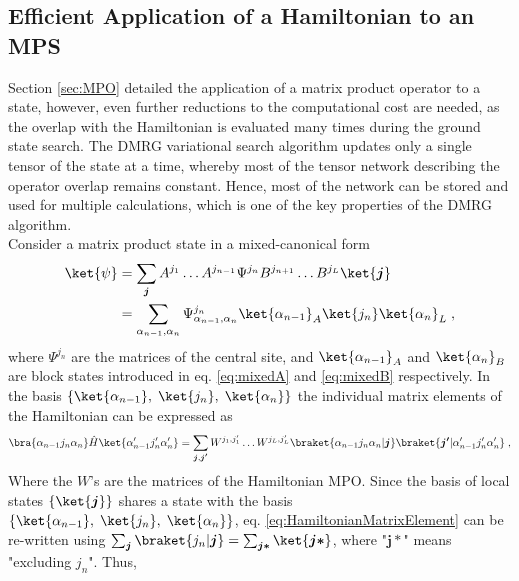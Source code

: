 \subsection{Efficient Application of a Hamiltonian to an MPS}
Section \ref{sec:MPO} detailed the application of a matrix product operator to a state, however, even further reductions to the computational cost are needed, as the overlap with the Hamiltonian is evaluated many times during the ground state search. The DMRG variational search algorithm updates only a single tensor of the state at a time, whereby most of the tensor network describing the operator overlap remains constant. Hence, most of the network can be stored and used for multiple calculations, which is one of the key properties of the DMRG algorithm.\\ 
Consider a matrix product state in a mixed-canonical form
\begin{align}
	\ket{\psi} &= \sum_{\boldsymbol{j}} A^{j_1} \ldots A^{j_{n-1}} \Psi^{j_n} B^{j_{n+1}} \ldots B^{j_{L}} \ket{\boldsymbol{j}} \nonumber \\
	&= \sum_{\alpha_{n-1} , \alpha_{n}} \Psi_{\alpha_{n-1} , \alpha_{n}}^{j_n} \ket{\alpha_{n-1}}_A \ket{j_n}  \ket{\alpha_{n}}_L \; ,
	\label{eq:MPSmixedsingle}
\end{align}
where $\Psi^{j_n}$ are the matrices of the central site, and $\ket{\alpha_{n-1}}_A$ and $\ket{\alpha_{n}}_B$ are block states introduced in eq. \eqref{eq:mixedA} and \eqref{eq:mixedB} respectively. In the basis $\{ \ket{\alpha_{n-1} }  , \; \ket{ j_n }  , \; \ket{\alpha_{n} } \}$ the individual matrix elements of the Hamiltonian can be expressed as
\begin{equation}
	\bra{\alpha_{n-1} j_n \alpha_{n}} \hat{H} \ket{\alpha_{n-1} ' j_n ' \alpha_{n} '} = \sum_{\boldsymbol{j} , \boldsymbol{j'}}  W^{j_1 , j_1 '} \ldots W^{j_L , j_L '}  \braket{\alpha_{n-1} j_n \alpha_{n} | \boldsymbol{j}} \braket{\boldsymbol{j'} | \alpha_{n-1} ' j_n ' \alpha_{n} '} \; , 
	\label{eq:HamiltonianMatrixElement}
\end{equation}
Where the $W$'s are the matrices of the Hamiltonian MPO.
Since the basis of local states $\{ \ket{\boldsymbol{j}} \}$ shares a state with the basis $\{ \ket{\alpha_{n-1} }  , \; \ket{ j_n }  , \; \ket{\alpha_{n} } \}$, eq. \eqref{eq:HamiltonianMatrixElement} can be re-written using $\sum_{\boldsymbol{j}} \braket{j_n | \boldsymbol{j}} = \sum_{\boldsymbol{j *}} \ket{ \boldsymbol{j *}}$, where "$\boldsymbol{j *}$" means "excluding $j_n$". Thus,
